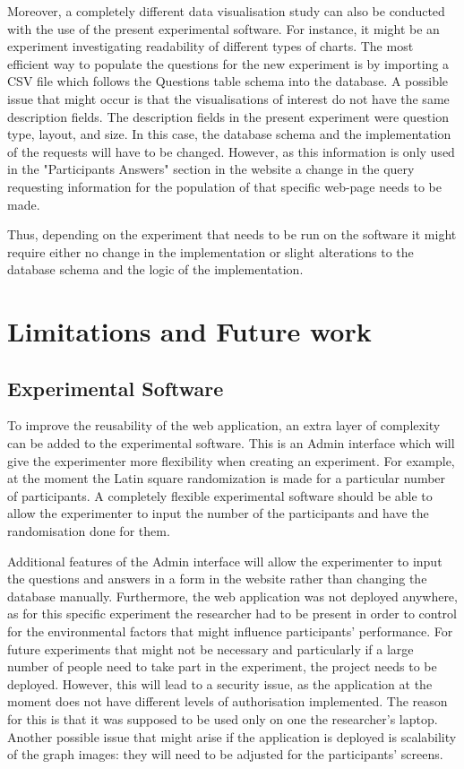 \documentclass{l4proj}
\begin{document}
Moreover, a completely different data visualisation study can also be conducted with the use of the present experimental software. For instance, it might be an experiment investigating readability of different types of charts. The most efficient way to populate the questions for the new experiment is by importing a CSV file which follows the Questions table schema into the database. A possible issue that might occur is that the visualisations of interest do not have the same description fields. The description fields in the present experiment were question type, layout, and size. In this case, the database schema and the implementation of the requests will have to be changed. However, as this information is only used in the "Participants Answers" section in the website a change in the query requesting information for the population of that specific web-page needs to be made.  

Thus, depending on the experiment that needs to be run on the software it might require either no change in the implementation or slight alterations to the database schema and the logic of the implementation.

\section{Limitations and Future work}

\subsection{Experimental Software}

To improve the reusability of the web application, an extra layer of complexity can be added to the experimental software. This is an Admin interface which will give the experimenter more flexibility when creating an experiment. For example, at the moment the Latin square randomization is made for a particular number of participants. A completely flexible experimental software should be able to allow the experimenter to input the number of the participants and have the randomisation done for them.

Additional features of the Admin interface will allow the experimenter to input the questions and answers in a form in the website rather than changing the database manually. Furthermore, the web application was not deployed anywhere, as for this specific experiment the researcher had to be present in order to control for the environmental factors that might influence participants' performance. For future experiments that might not be necessary and particularly if a large number of people need to take part in the experiment, the project needs to be deployed. However, this will lead to a security issue, as the application at the moment does not have different levels of authorisation implemented. The reason for this is that it was supposed to be used only on one the researcher's laptop. Another possible issue that might arise if the application is deployed is scalability of the graph images: they will need to be adjusted for the participants' screens. 
\end{document}
